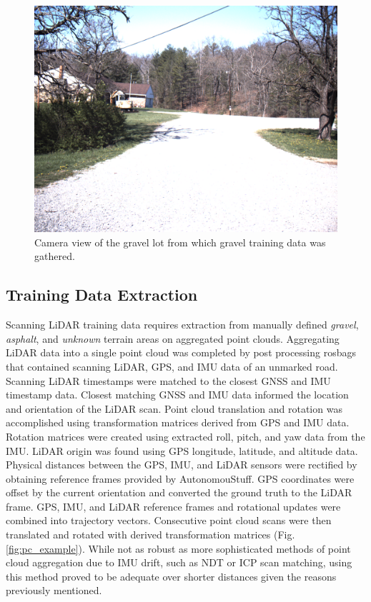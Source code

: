 \documentclass[journal,onecolumn]{IEEEtran}
\begin{document}
			\begin{figure}[H]
				\centering
				\includegraphics[width=0.75\linewidth]{figures/gravel_training_lot}
				\caption[Gravel Training Lot]{Camera view of the gravel lot from which gravel training data was gathered.}
				\label{fig:gravel_training_lot}
			\end{figure}			

		\subsection{Training Data Extraction}

			{Scanning LiDAR training data requires extraction from manually defined \textit{gravel}, \textit{asphalt}, and \textit{unknown} terrain areas on aggregated point clouds. Aggregating LiDAR data into a single point cloud was completed by post processing rosbags that contained scanning LiDAR, GPS, and IMU data of an unmarked road. Scanning LiDAR timestamps were matched to the closest GNSS and IMU timestamp data. Closest matching GNSS and IMU data informed the location and orientation of the LiDAR scan. Point cloud translation and rotation was accomplished using transformation matrices derived from GPS and IMU data. Rotation matrices were created using extracted roll, pitch, and yaw data from the IMU. LiDAR origin was found using GPS longitude, latitude, and altitude data. Physical distances between the GPS, IMU, and LiDAR sensors were rectified by obtaining reference frames provided by AutonomouStuff. GPS coordinates were offset by the current orientation and converted the ground truth to the LiDAR frame. GPS, IMU, and LiDAR reference frames and rotational updates were combined into trajectory vectors. Consecutive point cloud scans were then translated and rotated with derived transformation matrices (Fig. \ref{fig:pc_example}). While not as robust as more sophisticated methods of point cloud aggregation due to IMU drift, such as NDT or ICP scan matching, using this method proved to be adequate over shorter distances given the reasons previously mentioned.}
\end{document}
